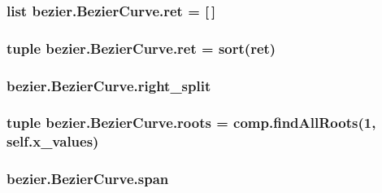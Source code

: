 \subsubsection[{ret}]{\setlength{\rightskip}{0pt plus 5cm}list bezier.\+Bezier\+Curve.\+ret = \mbox{[}$\,$\mbox{]}\hspace{0.3cm}{\ttfamily [static]}}\label{classbezier_1_1_bezier_curve_afb7008816c2eb9b266374b543b748b1c}
\hypertarget{classbezier_1_1_bezier_curve_adfebcda73ce613d7f913ed37541348c6}{}
\subsubsection[{ret}]{\setlength{\rightskip}{0pt plus 5cm}tuple bezier.\+Bezier\+Curve.\+ret = sort(ret)\hspace{0.3cm}{\ttfamily [static]}}\label{classbezier_1_1_bezier_curve_adfebcda73ce613d7f913ed37541348c6}
\hypertarget{classbezier_1_1_bezier_curve_a1537b07a507ce3a670363ca50fcfb8b9}{}
\subsubsection[{right\+\_\+split}]{\setlength{\rightskip}{0pt plus 5cm}bezier.\+Bezier\+Curve.\+right\+\_\+split}\label{classbezier_1_1_bezier_curve_a1537b07a507ce3a670363ca50fcfb8b9}
\hypertarget{classbezier_1_1_bezier_curve_a782e956673f761f25e256f1c2094d54b}{}
\subsubsection[{roots}]{\setlength{\rightskip}{0pt plus 5cm}tuple bezier.\+Bezier\+Curve.\+roots = comp.\+find\+All\+Roots(1, self.\+x\+\_\+values)\hspace{0.3cm}{\ttfamily [static]}}\label{classbezier_1_1_bezier_curve_a782e956673f761f25e256f1c2094d54b}
\hypertarget{classbezier_1_1_bezier_curve_abd2b09d5ae706c4e31f22b0c199134c0}{}
\subsubsection[{span}]{\setlength{\rightskip}{0pt plus 5cm}bezier.\+Bezier\+Curve.\+span}\label{classbezier_1_1_bezier_curve_abd2b09d5ae706c4e31f22b0c199134c0}
\hypertarget{classbezier_1_1_bezier_curve_a79e5e878938d38339da6d3bebb7bf337}{}

